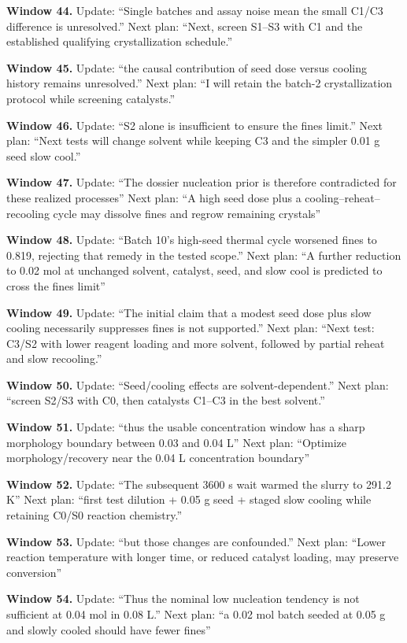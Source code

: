 \documentclass[10pt,a4paper]{article}
\begin{document}
\textbf{Window 44.} Update: ``Single batches and assay noise mean the small C1/C3 difference is unresolved.'' Next plan: ``Next, screen S1--S3 with C1 and the established qualifying crystallization schedule.''

\textbf{Window 45.} Update: ``the causal contribution of seed dose versus cooling history remains unresolved.'' Next plan: ``I will retain the batch-2 crystallization protocol while screening catalysts.''

\textbf{Window 46.} Update: ``S2 alone is insufficient to ensure the fines limit.'' Next plan: ``Next tests will change solvent while keeping C3 and the simpler 0.01 g seed slow cool.''

\textbf{Window 47.} Update: ``The dossier nucleation prior is therefore contradicted for these realized processes'' Next plan: ``A high seed dose plus a cooling--reheat--recooling cycle may dissolve fines and regrow remaining crystals''

\textbf{Window 48.} Update: ``Batch 10's high-seed thermal cycle worsened fines to 0.819, rejecting that remedy in the tested scope.'' Next plan: ``A further reduction to 0.02 mol at unchanged solvent, catalyst, seed, and slow cool is predicted to cross the fines limit''

\textbf{Window 49.} Update: ``The initial claim that a modest seed dose plus slow cooling necessarily suppresses fines is not supported.'' Next plan: ``Next test: C3/S2 with lower reagent loading and more solvent, followed by partial reheat and slow recooling.''

\textbf{Window 50.} Update: ``Seed/cooling effects are solvent-dependent.'' Next plan: ``screen S2/S3 with C0, then catalysts C1--C3 in the best solvent.''

\textbf{Window 51.} Update: ``thus the usable concentration window has a sharp morphology boundary between 0.03 and 0.04 L'' Next plan: ``Optimize morphology/recovery near the 0.04 L concentration boundary''

\textbf{Window 52.} Update: ``The subsequent 3600 s wait warmed the slurry to 291.2 K'' Next plan: ``first test dilution + 0.05 g seed + staged slow cooling while retaining C0/S0 reaction chemistry.''

\textbf{Window 53.} Update: ``but those changes are confounded.'' Next plan: ``Lower reaction temperature with longer time, or reduced catalyst loading, may preserve conversion''

\textbf{Window 54.} Update: ``Thus the nominal low nucleation tendency is not sufficient at 0.04 mol in 0.08 L.'' Next plan: ``a 0.02 mol batch seeded at 0.05 g and slowly cooled should have fewer fines''
\end{document}
